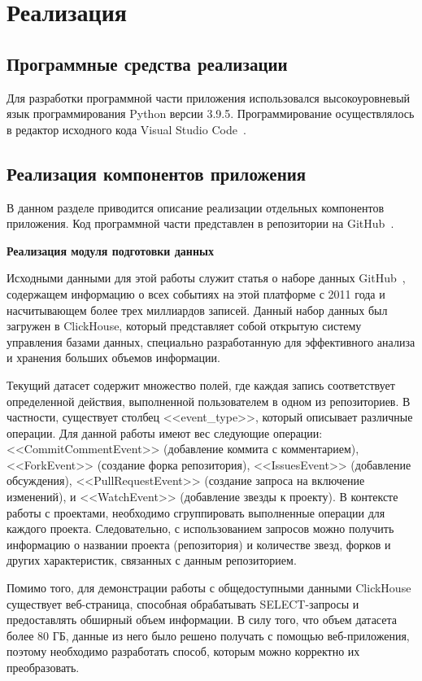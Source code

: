 \newpage
\section{Реализация}
\label{sec:Realization}

\subsection{Программные средства реализации}
Для разработки программной части приложения использовался высокоуровневый язык программирования Python версии 3.9.5. Программирование осуществлялось в редактор исходного кода Visual Studio Code~\cite{vscode}. 

\vspace{2em}
\subsection{Реализация компонентов приложения}
\label{subsec:Parser}
В данном разделе приводится описание реализации отдельных компонентов приложения. Код программной части представлен в репозитории на GitHub~\cite{github}.

\textbf{Реализация модуля подготовки данных}

Исходными данными для этой работы служит статья о наборе данных GitHub~\cite{clickHouse}, содержащем информацию о всех событиях на этой платформе с 2011 года и насчитывающем более трех миллиардов записей. Данный набор данных был загружен в ClickHouse, который представляет собой открытую систему управления базами данных, специально разработанную для эффективного анализа и хранения больших объемов информации. 

Текущий датасет содержит множество полей, где каждая запись соответствует определенной действия, выполненной пользователем в одном из репозиториев. В частности, существует столбец <<event\_type>>, который описывает различные операции. Для данной работы имеют вес следующие операции: <<CommitCommentEvent>> (добавление коммита с комментарием), <<ForkEvent>> (создание форка репозитория), <<IssuesEvent>> (добавление обсуждения), <<PullRequestEvent>> (создание запроса на включение изменений), и <<WatchEvent>> (добавление звезды к проекту). В контексте работы с проектами, необходимо сгруппировать выполненные операции для каждого проекта. Следовательно, с использованием запросов можно получить информацию о названии проекта (репозитория) и количестве звезд, форков и других характеристик, связанных с данным репозиторием.

Помимо того, для демонстрации работы с общедоступными данными ClickHouse существует веб-страница, способная обрабатывать SELECT-запросы и предоставлять обширный объем информации. В силу того, что объем датасета более 80 ГБ, данные из него было решено получать с помощью веб-приложения, поэтому необходимо разработать способ, которым можно корректно их преобразовать.

